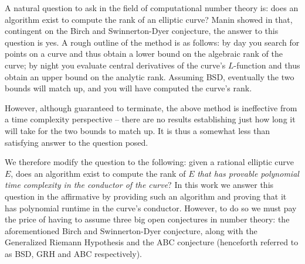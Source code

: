 
A natural question to ask in the field of computational number theory is: does an algorithm exist to compute the rank of an elliptic curve? Manin showed in \cite{Man-1971} that, contingent on the Birch and Swinnerton-Dyer conjecture, the answer to this question is yes. A rough outline of the method is as follows: by day you search for points on a curve and thus obtain a lower bound on the algebraic rank of the curve; by night you evaluate central derivatives of the curve's $L$-function and thus obtain an upper bound on the analytic rank. Assuming BSD, eventually the two bounds will match up, and you will have computed the curve's rank.

However, although guaranteed to terminate, the above method is ineffective from a time complexity perspective -- there are no results establishing just how long it will take for the two bounds to match up. It is thus a somewhat less than satisfying answer to the question posed.

We therefore modify the question to the following: given a rational elliptic curve $E$, does an algorithm exist to compute the rank of $E$ {\it that has provable polynomial time complexity in the conductor of the curve}? 
In this work we answer this question in the affirmative by providing such an algorithm and proving that it has polynomial runtime in the curve's conductor. However, to do so we must pay the price of having to assume three big open conjectures in number theory: the aforementioned Birch and Swinnerton-Dyer conjecture, along with the Generalized Riemann Hypothesis and the ABC conjecture (henceforth referred to as BSD, GRH and ABC respectively). \\


